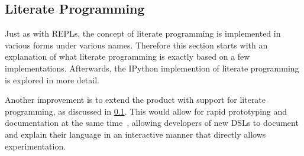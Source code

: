 \subsection{Literate Programming}
\label{sec:literate-programming}
Just as with REPLs, the concept of literate programming is implemented in
various forms under various names. Therefore this section starts with an
explanation of what literate programming is exactly based on a few
implementations. Afterwards, the IPython implemention of literate programming is
explored in more detail.

Another improvement is to extend the product with support for literate
programming, as discussed in \cref{sec:literate-programming}. This would allow 
for rapid prototyping and documentation at the same time~\cite{schulte2012},
allowing developers of new DSLs to document and explain their language in an
interactive manner that directly allows experimentation.

